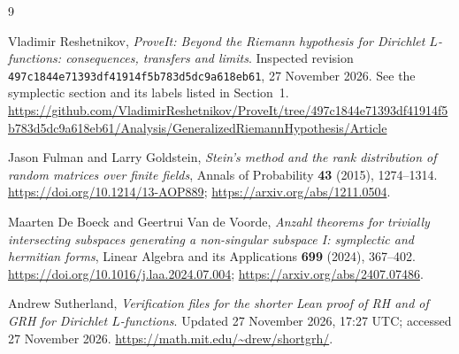 \documentclass[11pt,letterpaper]{article}
\theoremstyle{remark}
\begin{document}
\begin{thebibliography}{9}
\raggedright
{}
Vladimir Reshetnikov, \emph{ProveIt: Beyond the Riemann hypothesis for
Dirichlet $L$-functions: consequences, transfers and limits}.
Inspected revision \texttt{497c1844e71393df41914f5b783d5dc9a618eb61},
27 November 2026. See the symplectic section and its labels listed in
Section~1.\newline
\url{https://github.com/VladimirReshetnikov/ProveIt/tree/497c1844e71393df41914f5b783d5dc9a618eb61/Analysis/GeneralizedRiemannHypothesis/Article}

Jason Fulman and Larry Goldstein, \emph{Stein's method and the rank
distribution of random matrices over finite fields}, Annals of Probability
\textbf{43} (2015), 1274--1314.\newline
\url{https://doi.org/10.1214/13-AOP889};
\url{https://arxiv.org/abs/1211.0504}.

Maarten De Boeck and Geertrui Van de Voorde,
\emph{Anzahl theorems for trivially intersecting subspaces generating a
non-singular subspace I: symplectic and hermitian forms},
Linear Algebra and its Applications \textbf{699} (2024), 367--402.\newline
\url{https://doi.org/10.1016/j.laa.2024.07.004};
\url{https://arxiv.org/abs/2407.07486}.

Andrew Sutherland, \emph{Verification files for the shorter Lean proof of RH
and of GRH for Dirichlet $L$-functions}. Updated 27 November 2026,
17:27 UTC; accessed 27 November 2026.\newline
\url{https://math.mit.edu/~drew/shortgrh/}.
\end{thebibliography}
\end{document}
